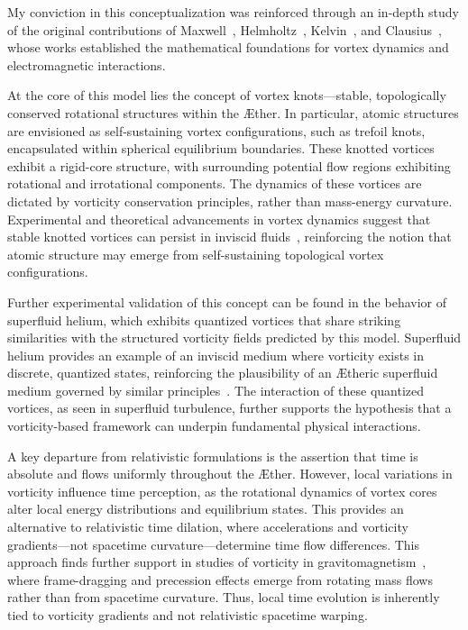 My conviction in this conceptualization was reinforced through an in-depth study of the original contributions of Maxwell~\cite{maxwell1861}, Helmholtz~\cite{helmholtz1858}, Kelvin~\cite{kelvin1867}, and Clausius~\cite{clausius1865}, whose works established the mathematical foundations for vortex dynamics and electromagnetic interactions.

At the core of this model lies the concept of vortex knots—stable, topologically conserved rotational structures within the Æther.
In particular, atomic structures are envisioned as self-sustaining vortex configurations, such as trefoil knots, encapsulated within spherical equilibrium boundaries.
These knotted vortices exhibit a rigid-core structure, with surrounding potential flow regions exhibiting rotational and irrotational components.
The dynamics of these vortices are dictated by vorticity conservation principles, rather than mass-energy curvature.
Experimental and theoretical advancements in vortex dynamics suggest that stable knotted vortices can persist in inviscid fluids~\cite{kleckner2013}, reinforcing the notion that atomic structure may emerge from self-sustaining topological vortex configurations.

Further experimental validation of this concept can be found in the behavior of superfluid helium, which exhibits quantized vortices that share striking similarities with the structured vorticity fields predicted by this model.
Superfluid helium provides an example of an inviscid medium where vorticity exists in discrete, quantized states, reinforcing the plausibility of an Ætheric superfluid medium governed by similar principles~\cite{vinen2002}.
The interaction of these quantized vortices, as seen in superfluid turbulence, further supports the hypothesis that a vorticity-based framework can underpin fundamental physical interactions.

A key departure from relativistic formulations is the assertion that time is absolute and flows uniformly throughout the Æther.
However, local variations in vorticity influence time perception, as the rotational dynamics of vortex cores alter local energy distributions and equilibrium states.
This provides an alternative to relativistic time dilation, where accelerations and vorticity gradients—not spacetime curvature—determine time flow differences.
This approach finds further support in studies of vorticity in gravitomagnetism~\cite{cahill2005}, where frame-dragging and precession effects emerge from rotating mass flows rather than from spacetime curvature.
Thus, local time evolution is inherently tied to vorticity gradients and not relativistic spacetime warping.

